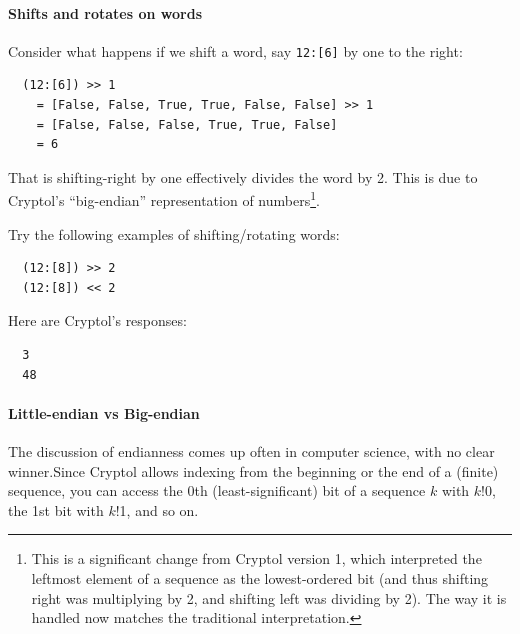 \paragraph*{Shifts and rotates on words} Consider what happens if we
shift a word, say {\tt 12:[6]} by one to the right:
\indShiftLeft\indShiftRight\indRotLeft\indRotRight
\begin{Verbatim}
  (12:[6]) >> 1
    = [False, False, True, True, False, False] >> 1
    = [False, False, False, True, True, False]
    = 6 
\end{Verbatim}
That is shifting-right by one effectively divides the word by 2. This
is due to Cryptol's ``big-endian'' representation of
numbers\footnote{This is a significant change from Cryptol version 1,
  which interpreted the leftmost element of a sequence as the
  lowest-ordered bit (and thus shifting right was multiplying by 2,
  and shifting left was dividing by 2). The way it is handled now
  matches the traditional
  interpretation.}.\indRotLeft\indRotRight\indShiftLeft\indShiftRight

\begin{Exercise}\label{ex:words:6}
Try the following examples of shifting/rotating words:
\begin{Verbatim}
  (12:[8]) >> 2
  (12:[8]) << 2
\end{Verbatim}
\end{Exercise}
\begin{Answer}
Here are Cryptol's responses:
\begin{Verbatim}
  3
  48
\end{Verbatim}
\end{Answer}


\paragraph*{Little-endian vs Big-endian} The discussion of endianness
comes up often in computer science, with no clear
winner.\indEndianness Since Cryptol allows indexing from the beginning
or the end of a (finite) sequence, you can access the 0th
(least-significant) bit of a sequence $k$ with $k$!0, the 1st bit with
$k$!1, and so on.\indIndex

